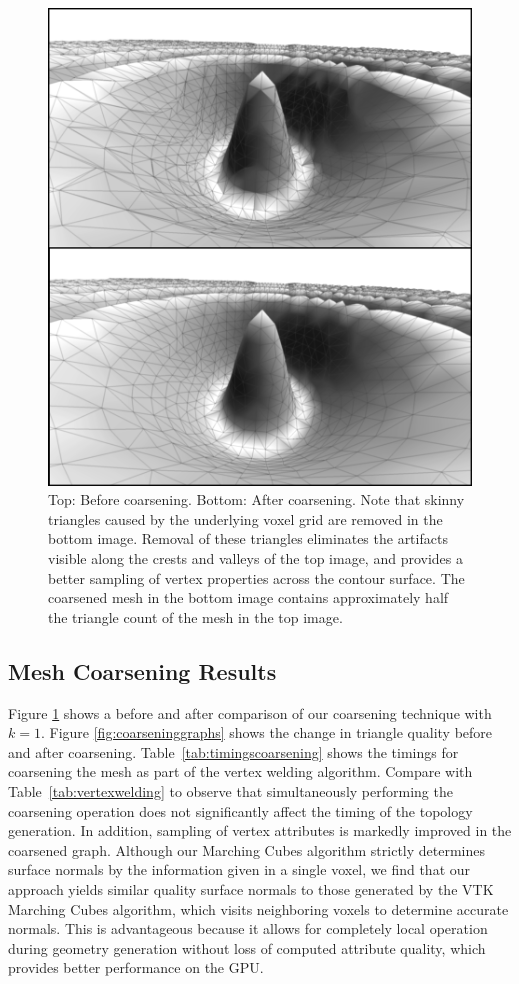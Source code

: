 \documentclass[10pt,journal,cspaper,compsoc]{IEEEtran}
\begin{document}
\begin{figure}[!tb]
\includegraphics[width=\columnwidth]{Coarsening}
\caption{Top: Before coarsening. Bottom: After coarsening. Note that skinny triangles caused by the underlying voxel grid are removed in the bottom image. Removal of these triangles eliminates the artifacts visible along the crests and valleys of the top image, and provides a better sampling of vertex properties across the contour surface. The coarsened mesh in the bottom image contains approximately half the triangle count of the mesh in the top image.}

\label{fig:coarsening}
\end{figure}

\subsection{Mesh Coarsening Results}
Figure \ref{fig:coarsening} shows a before and after comparison of our coarsening technique with $k=1$. 
Figure \ref{fig:coarseninggraphs} shows the change in triangle quality before and after coarsening.
Table~\ref{tab:timingscoarsening} shows the timings for coarsening the mesh as part of the vertex welding algorithm. Compare with Table~\ref{tab:vertexwelding} to observe that simultaneously performing the coarsening operation does not significantly affect the timing of the topology generation. In addition, sampling of vertex attributes is markedly improved in the coarsened graph. Although our Marching Cubes algorithm strictly determines surface normals by the information given in a single voxel, we find that our approach yields similar quality surface normals to those generated by the VTK Marching Cubes algorithm, which visits neighboring voxels to determine accurate normals. This is advantageous because it allows for completely local operation during geometry generation without loss of computed attribute quality, which provides better performance on the GPU.
\end{document}
